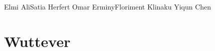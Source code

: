 \documentclass{tk3-team}
\begin{document}
%
                {Elmi Ali}{Satia Herfert}%
                {Omar Erminy}{Floriment Klinaku}%
                {Yiqun Chen}%

\section{Wuttever}
\end{document}

